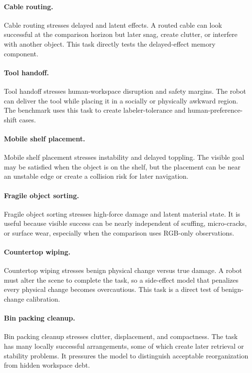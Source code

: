 \documentclass{article}
\begin{document}
\paragraph{Cable routing.}
Cable routing stresses delayed and latent effects. A routed cable can look successful at the comparison horizon but later snag, create clutter, or interfere with another object. This task directly tests the delayed-effect memory component.

\paragraph{Tool handoff.}
Tool handoff stresses human-workspace disruption and safety margins. The robot can deliver the tool while placing it in a socially or physically awkward region. The benchmark uses this task to create labeler-tolerance and human-preference-shift cases.

\paragraph{Mobile shelf placement.}
Mobile shelf placement stresses instability and delayed toppling. The visible goal may be satisfied when the object is on the shelf, but the placement can be near an unstable edge or create a collision risk for later navigation.

\paragraph{Fragile object sorting.}
Fragile object sorting stresses high-force damage and latent material state. It is useful because visible success can be nearly independent of scuffing, micro-cracks, or surface wear, especially when the comparison uses RGB-only observations.

\paragraph{Countertop wiping.}
Countertop wiping stresses benign physical change versus true damage. A robot must alter the scene to complete the task, so a side-effect model that penalizes every physical change becomes overcautious. This task is a direct test of benign-change calibration.

\paragraph{Bin packing cleanup.}
Bin packing cleanup stresses clutter, displacement, and compactness. The task has many locally successful arrangements, some of which create later retrieval or stability problems. It pressures the model to distinguish acceptable reorganization from hidden workspace debt.
\end{document}
